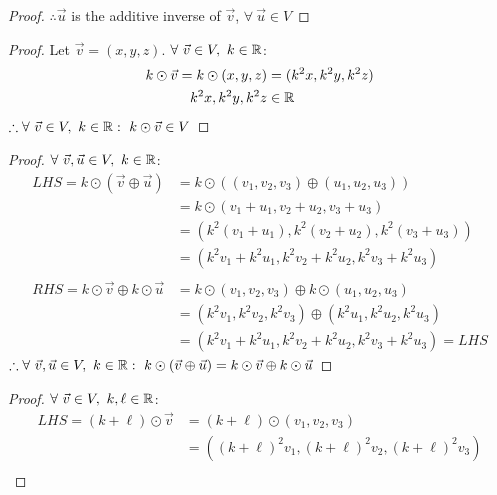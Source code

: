 \begin{enumerate}
\begin{proof}
    $\therefore \vec{u}$ is the additive inverse of $\vec{v}$, $\forall~\vec{u} \in V$
  \end{proof}
  \begin{proof}
    Let $\vec{v}=(x,y,z)$. $\forall~\vec{v} \in V,~k \in \mathbb{R}$:
    \begin{align*}
      k \odot \vec{v} = k \odot (x,y,z) & = (k^2x,k^2y,k^2z) \\
      k^2x,k^2y,k^2z                    & \in \mathbb{R}
    \end{align*}
    $\therefore \forall~\vec{v} \in V,~k \in \mathbb{R}:~k \odot \vec{v} \in V$
  \end{proof}
  \begin{proof}
    $\forall~\vec{v},\vec{u} \in V,~k \in \mathbb{R}$:
    \begin{align*}
      LHS = k \odot (\vec{v} \oplus \vec{u})       & = k \odot ((v_1,v_2,v_3) \oplus (u_1,u_2,u_3))         \\
                                                   & = k \odot (v_1+u_1,v_2+u_2,v_3+u_3)                    \\
                                                   & = (k^2(v_1+u_1), k^2(v_2+u_2), k^2(v_3+u_3))           \\
                                                   & = (k^2v_1+k^2u_1,k^2v_2+k^2u_2,k^2v_3+k^2u_3)          \\ \\
      RHS = k \odot \vec{v} \oplus k \odot \vec{u} & = k \odot (v_1,v_2,v_3) \oplus k \odot (u_1,u_2,u_3)   \\
                                                   & = (k^2v_1,k^2v_2,k^2v_3) \oplus (k^2u_1,k^2u_2,k^2u_3) \\
                                                   & = (k^2v_1+k^2u_1,k^2v_2+k^2u_2,k^2v_3+k^2u_3) = LHS
    \end{align*}
    $\therefore \forall~\vec{v},\vec{u} \in V,~k \in \mathbb{R}:~k \odot (\vec{v} \oplus \vec{u}) = k \odot \vec{v} \oplus k \odot \vec{u}$
  \end{proof}
  \begin{proof}
    $\forall~\vec{v} \in V,~k,\ell \in \mathbb{R}$:
    \begin{align*}
      LHS = (k+\ell) \odot \vec{v}                    & = (k+\ell) \odot (v_1,v_2,v_3)                                                          \\
                                                      & = ((k+\ell)^2v_1,(k+\ell)^2v_2,(k+\ell)^2v_3)                                           \\

\end{align*}
\end{proof}
\end{enumerate}
